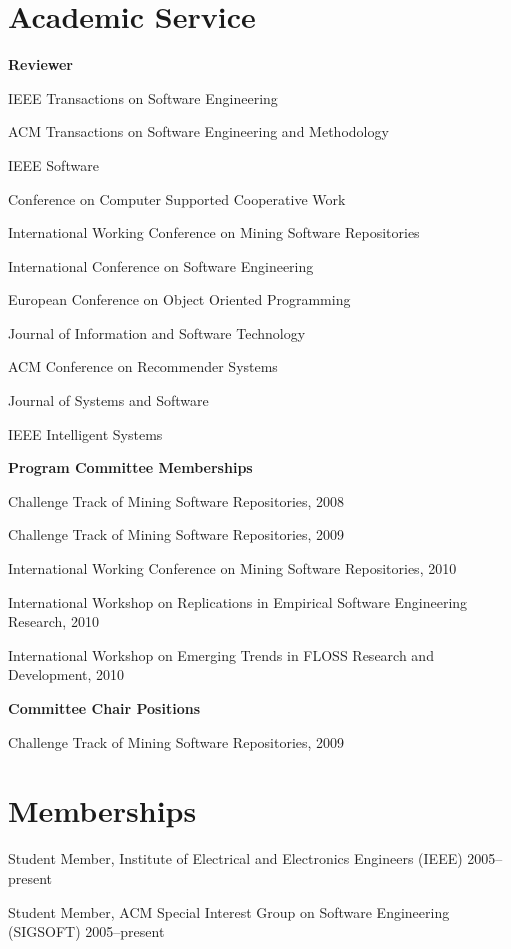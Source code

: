 \documentclass[margin,line,article]{res}
\newenvironment{noindentlist}{
  \begin{list}{}{%
      \setlength{\itemsep}{0in}
      \setlength{\parsep}{0in} \setlength{\parskip}{0in}
      \setlength{\topsep}{0in} \setlength{\partopsep}{0in} 
      \setlength{\leftmargin}{0in}}}{\end{list}}
\newenvironment{list1}{
  \begin{list}{}{%
      \setlength{\itemsep}{0in}
      \setlength{\parsep}{0in} \setlength{\parskip}{0in}
      \setlength{\topsep}{0in} \setlength{\partopsep}{0in} 
      \setlength{\leftmargin}{0.17in}}}{\end{list}}
\begin{document}
\begin{resume}
\section{Academic \hspace{.2in} Service}
\textbf{Reviewer}
\begin{list1}
\item IEEE Transactions on Software Engineering
\item ACM Transactions on Software Engineering and Methodology
\item IEEE Software
\item Conference on Computer Supported Cooperative Work
\item International Working Conference on Mining Software Repositories
\item International Conference on Software Engineering
\item European Conference on Object Oriented Programming
\item Journal of Information and Software Technology
\item ACM Conference on Recommender Systems
\item Journal of Systems and Software 
\item IEEE Intelligent Systems
\end{list1}

\textbf{Program Committee Memberships}
\begin{list1}
\item Challenge Track of Mining Software Repositories, 2008
\item Challenge Track of Mining Software Repositories, 2009
\item International Working Conference on Mining Software Repositories, 2010
\item International Workshop on Replications in Empirical Software Engineering Research, 2010
\item International Workshop on Emerging Trends in FLOSS Research and Development, 2010
\end{list1}

\textbf{Committee Chair Positions}
\begin{list1}
\item Challenge Track of Mining Software Repositories, 2009
\end{list1}

\section{Memberships}
\begin{noindentlist}
\item Student Member, Institute of Electrical and Electronics Engineers (IEEE) \hfill 2005--present
\item Student Member, ACM Special Interest Group on Software Engineering (SIGSOFT) \hfill 2005--present
\end{noindentlist}




\end{resume}
\end{document}
